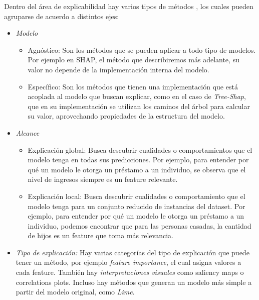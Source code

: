 Dentro del área de explicabilidad hay varios tipos de métodos \cite{interpretabilityBook}, los cuales pueden agruparse de acuerdo a distintos ejes:
\begin{itemize}
    \item \textit{Modelo}
        \begin{itemize}
            \item Agnóstico: Son los métodos que se pueden aplicar a todo tipo de modelos. Por ejemplo en SHAP, el método que describiremos más adelante, su valor no depende de la implementación interna del modelo. %
            \item Específico: Son los métodos que tienen una implementación que está acoplada al modelo que buscan explicar, como en el caso de \textit{Tree-Shap}, que en su implementación se utilizan los caminos del árbol para calcular su valor, aprovechando propiedades de la estructura del modelo.
        \end{itemize}
    \item \textit{Alcance}
        \begin{itemize}
            \item Explicación global: Busca descubrir cualidades o comportamientos que el modelo tenga en todas sus predicciones. Por ejemplo, para entender por qué un modelo le otorga un préstamo a un individuo, se observa que el nivel de ingresos siempre es un feature relevante. %
            \item Explicación local: Busca descubrir cualidades o comportamiento que el modelo tenga para un conjunto reducido de instancias del dataset. Por ejemplo, para entender por qué un modelo le otorga un préstamo a un individuo, podemos encontrar que para las personas casadas, la cantidad de hijos es un feature que toma más relevancia.  %
        \end{itemize}
    \item \textit{Tipo de explicación:} Hay varias categorías del tipo de explicación que puede tener un método, por ejemplo \textit{feature importance}, el cual asigna valores a cada feature. También hay \textit{interpretaciones visuales} como saliency maps o correlations plots. Incluso hay métodos que generan un modelo más simple a partir del modelo original, como \textit{Lime}. 


\end{itemize}
